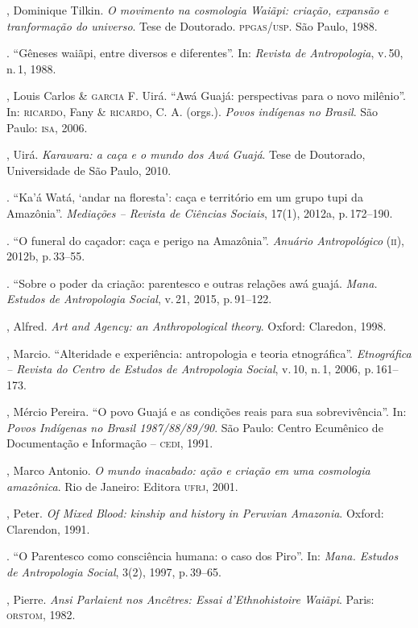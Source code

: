 \begin{bibliohedra}
, Dominique Tilkin. \emph{O movimento na cosmologia Waiãpi: criação, expansão
e tranformação do universo}. Tese de Doutorado. \textsc{ppgas}/\textsc{usp}. São Paulo, 1988.

\titidem. ``Gêneses waiãpi, entre diversos e diferentes''. In:
\emph{Revista de Antropologia}, v.\,50, n.\,1, 1988.

, Louis Carlos \& \textsc{garcia} F. Uirá. ``Awá Guajá: perspectivas para o novo milênio''. In: \textsc{ricardo}, Fany \& \textsc{ricardo}, C. A. (orgs.). \emph{Povos indígenas no Brasil}. São Paulo: \textsc{isa}, 2006.

, Uirá. \emph{Karawara: a caça e o mundo dos Awá Guajá}. Tese de
Doutorado, Universidade de São Paulo, 2010.

\titidem. ``Ka'á Watá, `andar na floresta': caça e território em
um grupo tupi da Amazônia''. \emph{Mediações -- Revista de Ciências
Sociais}, 17(1), 2012a, p.\,172--190.

\titidem. ``O funeral do caçador: caça e perigo na Amazônia''.
\emph{Anuário Antropológico} (\textsc{ii}), 2012b, p.\,33--55.

\titidem. ``Sobre o poder da criação: parentesco e outras relações
awá guajá. \emph{Mana. Estudos de Antropologia Social}, v.\,21, 2015, p.\,91--122.

, Alfred. \emph{Art and Agency: an Anthropological theory}. Oxford:
Claredon, 1998.

, Marcio. ``Alteridade e experiência: antropologia e teoria
etnográfica''. \emph{Etnográfica -- Revista do Centro de Estudos de
Antropologia Social}, v.\,10, n.\,1, 2006, p.\,161--173.

, Mércio Pereira. ``O povo Guajá e as condições reais para sua
sobrevivência''. In: \emph{Povos Indígenas no Brasil 1987/88/89/90}. São
Paulo: Centro Ecumênico de Documentação e Informação -- \textsc{cedi}, 1991.

, Marco Antonio. \emph{O mundo inacabado: ação e criação em uma cosmologia
amazônica}. Rio de Janeiro: Editora \textsc{ufrj}, 2001.

, Peter. \emph{Of Mixed Blood: kinship and history in Peruvian
Amazonia}. Oxford: Clarendon, 1991.

\titidem. ``O Parentesco como consciência humana: o caso dos Piro''.
In: \emph{Mana. Estudos de Antropologia Social}, 3(2), 1997, p.\,39--65.

, Pierre. \emph{Ansi Parlaient nos Ancêtres: Essai d'Ethnohistoire
Waiãpi}. Paris: \textsc{orstom}, 1982.


\end{bibliohedra}
